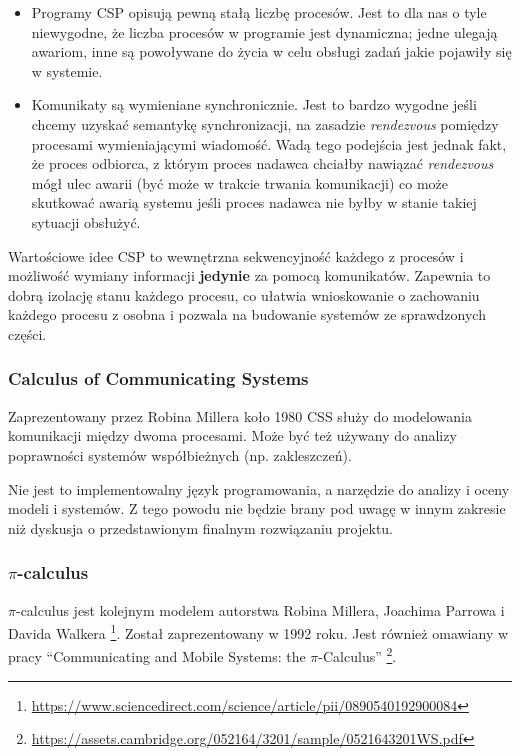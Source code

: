 \documentclass[11pt,oneside,a4paper,titlepage,onecolumn]{article}
\begin{document}
\begin{itemize}
\item Programy CSP opisują pewną stałą liczbę procesów. Jest to dla nas o tyle niewygodne, że liczba
    procesów w programie jest dynamiczna; jedne ulegają awariom, inne są powoływane do życia w celu
    obsługi zadań jakie pojawiły się w systemie.
\item Komunikaty są wymieniane synchronicznie. Jest to bardzo wygodne jeśli chcemy uzyskać semantykę
    synchronizacji, na zasadzie \emph{rendezvous} pomiędzy procesami wymieniającymi wiadomość.
    Wadą tego podejścia jest jednak fakt, że proces odbiorca, z którym proces nadawca chciałby nawiązać
    \emph{rendezvous} mógł ulec awarii (być może w trakcie trwania komunikacji) co może skutkować
    awarią systemu jeśli proces nadawca nie byłby w stanie takiej sytuacji obsłużyć.
\end{itemize}

Wartościowe idee CSP to wewnętrzna sekwencyjność każdego z procesów i możliwość wymiany informacji
\textbf{jedynie} za pomocą komunikatów. Zapewnia to dobrą izolację stanu każdego procesu, co ułatwia
wnioskowanie o zachowaniu każdego procesu z osobna i pozwala na budowanie systemów ze sprawdzonych
części.

\subsubsection{Calculus of Communicating Systems}

Zaprezentowany przez Robina Millera koło 1980 CSS służy do modelowania komunikacji między dwoma
procesami. Może być też używany do analizy poprawności systemów współbieżnych (np. zakleszczeń).

Nie jest to implementowalny język programowania, a narzędzie do analizy i oceny modeli i systemów.
Z tego powodu nie będzie brany pod uwagę w innym zakresie niż dyskusja o przedstawionym finalnym
rozwiązaniu projektu.

\subsubsection{$\pi$-calculus}

$\pi$-calculus jest kolejnym modelem autorstwa Robina Millera, Joachima Parrowa i Davida Walkera
\footnote{\url{https://www.sciencedirect.com/science/article/pii/0890540192900084}}.
Został zaprezentowany w 1992 roku.
Jest również omawiany w pracy ``Communicating and Mobile Systems: the $\pi$-Calculus''
\footnote{\url{https://assets.cambridge.org/052164/3201/sample/0521643201WS.pdf}}.
\end{document}
